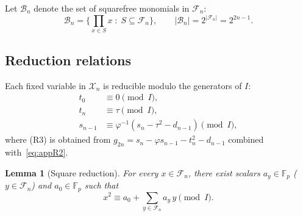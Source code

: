 \documentclass[11pt,a4paper]{article}
\newtheorem{lemma}[theorem]{Lemma}
\theoremstyle{definition}
\newcommand{\F}{\mathbb{F}}
\begin{document}
Let $\mathcal{B}_n$ denote the set of squarefree monomials in
$\mathcal{F}_n$:
\[
\mathcal{B}_n = \biggl\{ \prod_{x \in S} x \;:\; S \subseteq \mathcal{F}_n \biggr\},
\qquad
|\mathcal{B}_n| = 2^{|\mathcal{F}_n|} = 2^{2n-1}.
\]

\subsection{Reduction relations}\label{app:dreg:reductions}

Each fixed variable in $\mathcal{X}_n$ is reducible modulo the
generators of $I$:
\begin{align}
t_0       &\equiv 0 \pmod{I}, \tag{R1}\label{eq:appR1}\\
t_n       &\equiv \tau \pmod{I}, \tag{R2}\label{eq:appR2}\\
s_{n-1}   &\equiv \varphi^{-1} (s_n - \tau^2 - d_{n-1}) \pmod{I},
\tag{R3}\label{eq:appR3}
\end{align}
where (R3) is obtained from $g_{2n} = s_n - \varphi s_{n-1} - t_n^2 -
d_{n-1}$ combined with~\eqref{eq:appR2}.

\begin{lemma}[Square reduction]\label{lem:sq_reduction}
For every $x \in \mathcal{F}_n$, there exist scalars $a_y \in \F_p$
($y \in \mathcal{F}_n$) and $a_0 \in \F_p$ such that
\[
x^2 \equiv a_0 + \sum_{y \in \mathcal{F}_n} a_y \, y \pmod{I}.
\]
\end{lemma}
\end{document}
